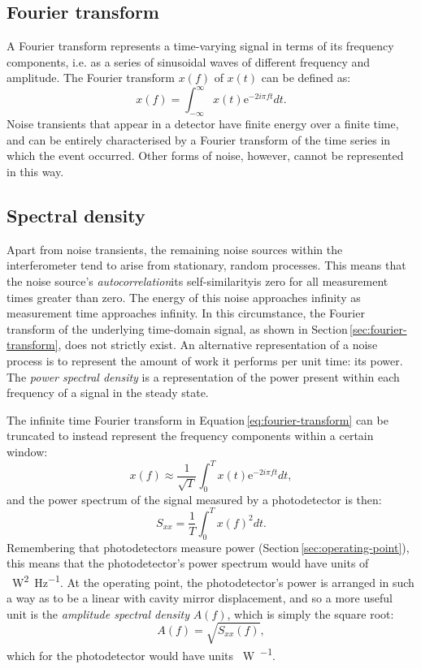 \subsection{\label{sec:fourier-transform}Fourier transform}
A Fourier transform represents a time-varying signal in terms of its frequency components, i.e. as a series of sinusoidal waves of different frequency and amplitude. The Fourier transform $x \left( f \right)$ of $x \left( t \right)$ can be defined as:
\begin{equation}
  \label{eq:fourier-transform}
  x \left( f \right) = \int^{\infty}_{-\infty} x \left( t \right) \text{e}^{-2i \pi f t} dt.
\end{equation}
Noise transients that appear in a detector have finite energy over a finite time, and can be entirely characterised by a Fourier transform of the time series in which the event occurred. Other forms of noise, however, cannot be represented in this way.

\subsection{Spectral density}
Apart from noise transients, the remaining noise sources within the interferometer tend to arise from stationary, random processes. This means that the noise source's \emph{autocorrelation}\textemdash its self-similarity\textemdash is zero for all measurement times greater than zero. The energy of this noise approaches infinity as measurement time approaches infinity. In this circumstance, the Fourier transform of the underlying time-domain signal, as shown in Section\,\ref{sec:fourier-transform}, does not strictly exist. An alternative representation of a noise process is to represent the amount of work it performs per unit time: its power. The \emph{power spectral density} is a representation of the power present within each frequency of a signal in the steady state.

The infinite time Fourier transform in Equation\,\ref{eq:fourier-transform} can be truncated to instead represent the frequency components within a certain window:
\begin{equation}
  x \left( f \right) \approx \frac{1}{\sqrt{T}} \int^{T}_{0} x \left( t \right) \text{e}^{-2i \pi f t} dt,
\end{equation}
and the power spectrum of the signal measured by a photodetector is then:
\begin{equation}
  \label{eq:psd}
  S_{xx} = \frac{1}{T} \int^{T}_{0} x \left( f \right)^2 dt.
\end{equation}
Remembering that photodetectors measure power (Section\,\ref{sec:operating-point}), this means that the photodetector's power spectrum would have units of \SI{}{\watt^2\per\hertz}. At the operating point, the photodetector's power is arranged in such a way as to be a linear with cavity mirror displacement, and so a more useful unit is the \emph{amplitude spectral density} $A \left( f \right)$, which is simply the square root:
\begin{equation}
  A \left( f \right) = \sqrt{S_{xx} \left( f \right)},
\end{equation}
which for the photodetector would have units \SI{}{\watt\per\sqrthz}.

